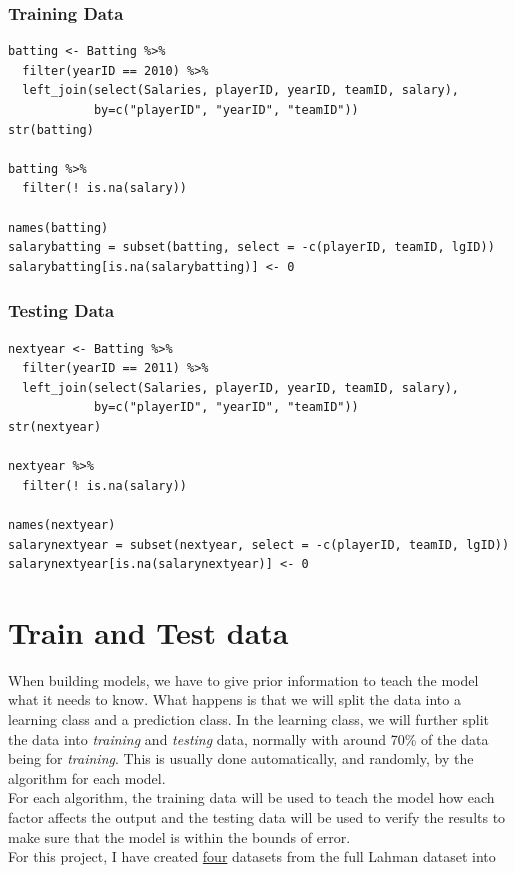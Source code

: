 \documentclass[11pt,a4paper]{report}
\begin{document}
\subsubsection{Training Data}
\begin{lstlisting}[basicstyle=\scriptsize]
batting <- Batting %>%
  filter(yearID == 2010) %>%
  left_join(select(Salaries, playerID, yearID, teamID, salary), 
            by=c("playerID", "yearID", "teamID"))
str(batting)

batting %>%
  filter(! is.na(salary))

names(batting)
salarybatting = subset(batting, select = -c(playerID, teamID, lgID))
salarybatting[is.na(salarybatting)] <- 0
\end{lstlisting}

\subsubsection{Testing Data}
\begin{lstlisting}[basicstyle=\scriptsize]
nextyear <- Batting %>%
  filter(yearID == 2011) %>%
  left_join(select(Salaries, playerID, yearID, teamID, salary), 
            by=c("playerID", "yearID", "teamID"))
str(nextyear)

nextyear %>%
  filter(! is.na(salary))

names(nextyear)
salarynextyear = subset(nextyear, select = -c(playerID, teamID, lgID))
salarynextyear[is.na(salarynextyear)] <- 0
\end{lstlisting}


\section{Train and Test data}
When building models, we have to give prior information to teach the model what it needs to know.
What happens is that we will split the data into a learning class and a prediction class. 
In the learning class, we will further split the data into \textit{training} and \textit{testing} data, normally with around 70\% of the data being for \textit{training}. 
This is usually done automatically, and randomly, by the algorithm for each model.\\
For each algorithm, the training data will be used to teach the model how each factor affects the output and the testing data will be used to verify the results to make sure that the model is within the bounds of error.
\bigskip\\
For this project, I have created \underline{four} datasets from the full Lahman dataset into 
\end{document}
